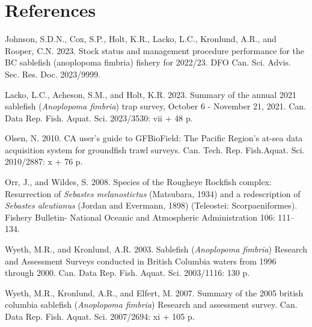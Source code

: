 \documentclass[12pt]{article}\usepackage[]{graphicx}\usepackage[]{color}
\begin{document}
\clearpage

\hypertarget{references}{%
\section{References}\label{references}}

\noindent \vspace{-2em} \setlength{\parindent}{-0.2in} \setlength{\leftskip}{0.2in} \setlength{\parskip}{8pt}

\hypertarget{refs}{}
\begin{CSLReferences}{1}{0}
%
Johnson, S.D.N., Cox, S.P., Holt, K.R., Lacko, L.C., Kronlund, A.R., and Rooper, C.N. 2023. Stock status and management procedure performance for the BC sablefish (anoplopoma fimbria) fishery for 2022/23. DFO Can. Sci. Advis. Sec. Res. Doc. 2023/9999.

%
Lacko, L.C., Acheson, S.M., and Holt, K.R. 2023. Summary of the annual 2021 sablefish ({\emph{Anoplopoma fimbria}}) trap survey, {O}ctober 6 - {N}ovember 21, 2021. Can. Data Rep. Fish. Aquat. Sci. 2023/3530: vii + 48 p.

%
Olsen, N. 2010. CA user's guide to {GFBioField: The Pacific Region's} at-sea data acquisition system for groundfish trawl surveys. Can. Tech. Rep. Fish.Aquat. Sci. 2010/2887: x + 76 p.

%
Orr, J., and Wildes, S. 2008. Species of the {R}ougheye {R}ockfish complex: {R}esurrection of {\emph{Sebastes melanostictus}} ({M}atsubara, 1934) and a redescription of {\emph{Sebastes aleutianus}} ({J}ordan and {E}vermann, 1898) ({T}eleostei: {S}corpaeniformes). Fishery Bulletin- National Oceanic and Atmospheric Administration 106: 111--134.

%
Wyeth, M.R., and Kronlund, A.R. 2003. Sablefish ({\emph{Anoplopoma fimbria}}) {Research and Assessment Surveys} conducted in {British Columbia} waters from 1996 through 2000. Can. Data Rep. Fish. Aquat. Sci. 2003/1116: 130 p.

%
Wyeth, M.R., Kronlund, A.R., and Elfert, M. 2007. Summary of the 2005 british columbia sablefish ({\emph{Anoplopoma fimbria}}) {R}esearch and assessment survey. Can. Data Rep. Fish. Aquat. Sci. 2007/2694: xi + 105 p.

\end{CSLReferences}
\end{document}
